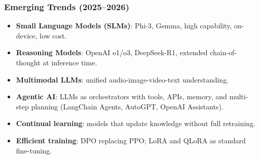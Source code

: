 \begin{frame}[fragile]\frametitle{Emerging Trends (2025--2026)}
\begin{itemize}
\item \textbf{Small Language Models (SLMs)}: Phi-3, Gemma, high capability, on-device, low cost.
\item \textbf{Reasoning Models}: OpenAI o1/o3, DeepSeek-R1, extended chain-of-thought at inference time.
\item \textbf{Multimodal LLMs}: unified audio-image-video-text understanding.
\item \textbf{Agentic AI}: LLMs as orchestrators with tools, APIs, memory, and multi-step planning (LangChain Agents, AutoGPT, OpenAI Assistants).
\item \textbf{Continual learning}: models that update knowledge without full retraining.
\item \textbf{Efficient training}: DPO replacing PPO; LoRA and QLoRA as standard fine-tuning.
\end{itemize}
\end{frame}

